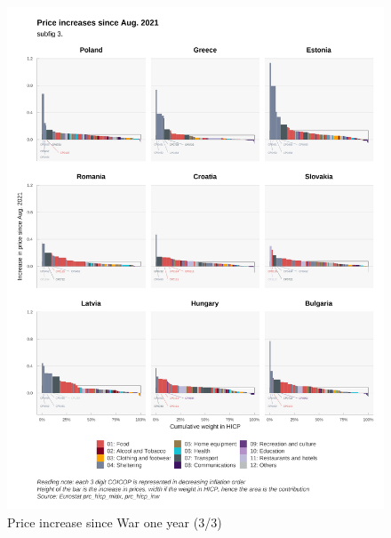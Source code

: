 \documentclass[
  9pt,
  a4paper,
  numbers=noendperiod,
  DIV=12]{scrartcl}
\begin{document}
\begin{figure}

\caption{Price increase since War one year (3/3)}

{\centering \includegraphics{../svg/depuis_1y_3.png}

}

\end{figure}
\end{document}
